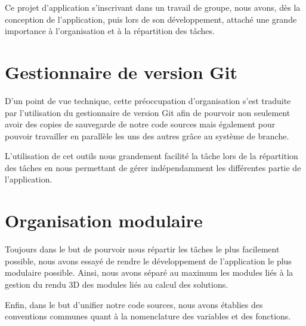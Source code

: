 Ce projet d'application s'inscrivant dans un travail de groupe, nous avons, dès la conception de l'application, puis lors de son développement, attaché une grande importance à l'organisation et à la répartition des tâches.

\section{Gestionnaire de version Git}
D'un point de vue technique, cette préoccupation d'organisation s'est traduite par l'utilisation du gestionnaire de version Git afin de pourvoir non seulement avoir des copies de sauvegarde de notre code sources mais également pour pouvoir travailler en parallèle les uns des autres grâce au système de branche.

L'utilisation de cet outils nous grandement facilité la tâche lors de la répartition des tâches en nous permettant de gérer indépendamment les différentes partie de l'application.

\section{Organisation modulaire}
Toujours dans le but de pourvoir nous répartir les tâches le plus facilement possible, nous avons essayé de rendre le développement de l'application le plus modulaire possible. Ainsi, nous avons séparé au maximum les modules liés à la gestion du rendu 3D des modules liés au calcul des solutions.

Enfin, dans le but d'unifier notre code sources, nous avons établies des conventions communes quant à la nomenclature des variables et des fonctions.